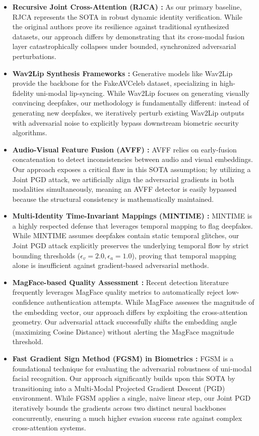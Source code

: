 \documentclass[conference]{IEEEtran}
\begin{document}
\begin{itemize}
    \item \textbf{Recursive Joint Cross-Attention (RJCA) \cite{ref1}:} As our primary baseline, RJCA represents the SOTA in robust dynamic identity verification. While the original authors prove its resilience against traditional synthesized datasets, our approach differs by demonstrating that its cross-modal fusion layer catastrophically collapses under bounded, synchronized adversarial perturbations.
    \item \textbf{Wav2Lip Synthesis Frameworks \cite{ref2}:} Generative models like Wav2Lip provide the backbone for the FakeAVCeleb dataset, specializing in high-fidelity uni-modal lip-syncing. While Wav2Lip focuses on generating visually convincing deepfakes, our methodology is fundamentally different: instead of generating new deepfakes, we iteratively perturb existing Wav2Lip outputs with adversarial noise to explicitly bypass downstream biometric security algorithms.
    \item \textbf{Audio-Visual Feature Fusion (AVFF) \cite{ref6}:} AVFF relies on early-fusion concatenation to detect inconsistencies between audio and visual embeddings. Our approach exposes a critical flaw in this SOTA assumption; by utilizing a Joint PGD attack, we artificially align the adversarial gradients in both modalities simultaneously, meaning an AVFF detector is easily bypassed because the structural consistency is mathematically maintained.
    \item \textbf{Multi-Identity Time-Invariant Mappings (MINTIME) \cite{ref7}:} MINTIME is a highly respected defense that leverages temporal mapping to flag deepfakes. While MINTIME assumes deepfakes contain static temporal glitches, our Joint PGD attack explicitly preserves the underlying temporal flow by strict bounding thresholds ($\epsilon_{v}=2.0, \epsilon_{a}=1.0$), proving that temporal mapping alone is insufficient against gradient-based adversarial methods.
    \item \textbf{MagFace-based Quality Assessment \cite{ref8}:} Recent detection literature frequently leverages MagFace quality metrics to automatically reject low-confidence authentication attempts. While MagFace assesses the magnitude of the embedding vector, our approach differs by exploiting the cross-attention geometry. Our adversarial attack successfully shifts the embedding angle (maximizing Cosine Distance) without alerting the MagFace magnitude threshold.
    \item \textbf{Fast Gradient Sign Method (FGSM) in Biometrics \cite{ref4}:} FGSM is a foundational technique for evaluating the adversarial robustness of uni-modal facial recognition. Our approach significantly builds upon this SOTA by transitioning into a Multi-Modal Projected Gradient Descent (PGD) environment. While FGSM applies a single, naive linear step, our Joint PGD iteratively bounds the gradients across two distinct neural backbones concurrently, ensuring a much higher evasion success rate against complex cross-attention systems.
\end{itemize}
\end{document}
